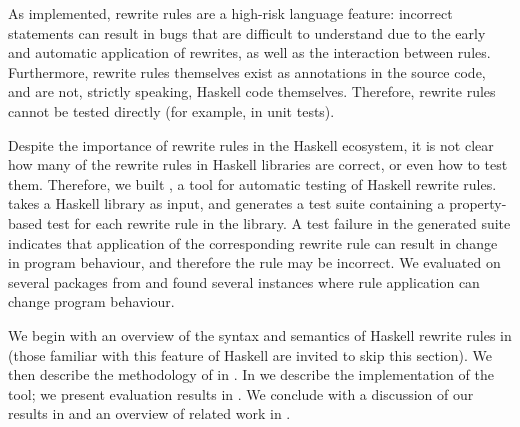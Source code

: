 As implemented, rewrite rules are a high-risk language feature: incorrect
statements can result in bugs that are difficult to understand due to the early
and automatic application of rewrites, as well as the interaction between rules.
Furthermore, rewrite rules themselves exist as annotations in the source code,
and are not, strictly speaking, Haskell code themselves. Therefore, rewrite
rules cannot be tested directly (for example, in unit tests).

Despite the importance of rewrite rules in the Haskell ecosystem, it is not
clear how many of the rewrite rules in Haskell libraries are correct, or even
how to test them. Therefore, we built \Rulecheck, a tool for automatic testing
of Haskell rewrite rules. \Rulecheck takes a Haskell library as input, and
generates a test suite containing a property-based test for each rewrite rule in
the library. A test failure in the generated suite indicates that application of
the corresponding rewrite rule can result in change in program behaviour, and
therefore the rule may be incorrect. We evaluated \Rulecheck on several packages
from \Hackage and found several instances where rule application can change
program behaviour.

We begin with an overview of the syntax and semantics of Haskell rewrite rules in
 (those familiar with this feature of Haskell are
invited to skip this section). We then describe the methodology of \Rulecheck in
. In  we describe the implementation
of the tool; we present evaluation results in . We conclude
with a discussion of our results in  and an overview of
related work in .
